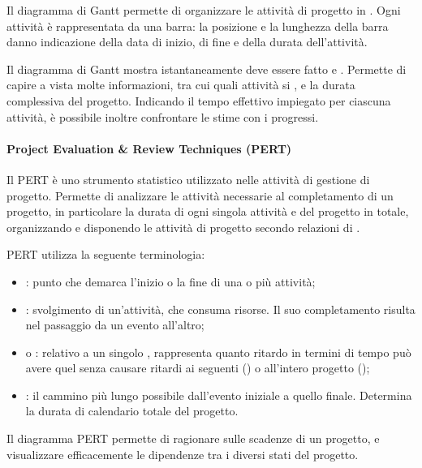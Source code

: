 Il diagramma di Gantt permette di organizzare le attività di progetto in
. Ogni attività è rappresentata da una barra: la
posizione e
la lunghezza della barra danno indicazione della data di inizio, di fine e della
durata dell'attività.


Il diagramma di Gantt mostra istantaneamente  deve essere fatto e
. Permette di capire a vista molte informazioni, tra cui quali
attività si , e la durata complessiva del progetto.
Indicando il tempo effettivo impiegato per ciascuna attività, è possibile
inoltre confrontare le stime con i progressi.

\paragraph{Project Evaluation \& Review Techniques (PERT)}

Il PERT è uno strumento statistico utilizzato nelle attività di gestione di
progetto. Permette di analizzare le attività necessarie al completamento di un
progetto, in particolare la durata di ogni singola attività e del progetto in
totale, organizzando e disponendo le attività di progetto secondo relazioni di
.

PERT utilizza la seguente terminologia:

\begin{itemize}
  \item {}: punto che demarca l'inizio o la fine di una o più
    attività;
  \item {}: svolgimento di un'attività, che consuma risorse.
    Il suo completamento risulta nel passaggio da un evento all'altro;
  \item {} o : relativo a un
    singolo , rappresenta quanto ritardo in termini di tempo può
    avere quel  senza causare ritardi ai  seguenti
    () o all'intero progetto ();
  \item {}: il cammino più lungo possibile dall'evento
    iniziale a quello finale. Determina la durata di calendario totale del
    progetto.
\end{itemize}

Il diagramma PERT permette di ragionare sulle scadenze di un progetto, e
visualizzare efficacemente le dipendenze tra i diversi stati del progetto.


